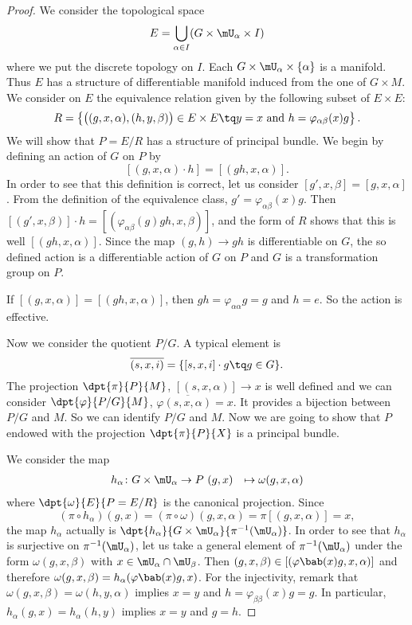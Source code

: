 \begin{proof}
	We consider the topological space
	\begin{equation}
		E=\bigcup_{\alpha\in I}(G\times\mU_{\alpha}\times I)
	\end{equation}
	where we put the discrete topology on $I$. Each $G\times\mU_{\alpha}\times\{\alpha\}$ is a manifold. Thus $E$ has a structure of differentiable manifold induced from the one of $G\times M$. We consider on $E$ the equivalence relation given by the following subset of $E\times E$:
	\[
		R=\left\{\big(  (g,x,\alpha),(h,y,\beta)\big)\in E\times E\tq y=x\text{ and }  h=\varphi_{\alpha\beta}(x)g \right\}.
	\]
	We will show that $P=E/R$ has a structure of principal bundle. We begin by defining an action of $G$ on $P$ by
	\[
		[ (g,x,\alpha)\cdot h ]=[ (gh,x,\alpha) ].
	\]
	In order to see that this definition is correct, let us consider $[g',x,\beta]=[g,x,\alpha]$. From the definition of the equivalence class, $g'=\varphi_{\alpha\beta}(x)g$. Then $[(g',x,\beta)]\cdot h=[(\varphi_{\alpha\beta}(g)gh,x,\beta)]$, and the form of $R$ shows that this is well $[(gh,x,\alpha)]$. Since the map $(g,h)\to gh$ is differentiable on $G$, the so defined action is a differentiable action of $G$ on $P$ and $G$ is a transformation group on $P$.

	If $[(g,x,\alpha)]=[(gh,x,\alpha)]$, then $gh=\varphi_{\alpha\alpha}g=g$ and $h=e$. So the action is effective.

	Now we consider the quotient $P/G$. A typical element is
	\[
		\overline{ (s,x,i) }=\{ [s,x,i]\cdot g\tq g\in G \}.
	\]
	The projection $\dpt{\pi}{P}{M}$, $[(s,x,\alpha)]\to x$ is well defined and we can consider $\dpt{\varphi}{P/G}{M}$, $\varphi\overline{(s,x,\alpha)}=x$. It provides a bijection between $P/G$ and $M$. So we can identify $P/G$ and $M$. Now we are going to show that $P$ endowed with the projection $\dpt{\pi}{P}{X}$ is a principal bundle.

	We consider the map
	\begin{equation}
		\begin{aligned}
			h_{\alpha} \colon G\times\mU_{\alpha} & \to P\
			(g,x)                                 & \mapsto \omega(g,x,\alpha)
		\end{aligned}
	\end{equation}
	where $\dpt{\omega}{E}{P=E/R}$ is the canonical projection. Since
	\[
		(\pi\circ h_{\alpha})(g,x)=(\pi\circ\omega)(g,x,\alpha)=\pi[(g,x,\alpha)]=x,
	\]
	the map $h_{\alpha}$ actually is $\dpt{h_{\alpha}}{G\times\mU_{\alpha}}{\pi^{-1}(\mU_{\alpha})}$. In order to see that $h_{\alpha}$ is surjective on $\pi^{-1}(\mU_{\alpha})$, let us take a general element of $\pi^{-1}(\mU_{\alpha})$ under the form $\omega(g,x,\beta)$ with $x\in\mU_{\alpha}\cap\mU_{\beta}$. Then $(g,x,\beta)\in[ (\varphi\bab(x)g,x,\alpha) ]$ and therefore $\omega(g,x,\beta)=h_{\alpha}(\varphi\bab(x)g,x)$. For the injectivity, remark that $\omega(g,x,\beta)=\omega(h,y,\alpha)$ implies $x=y$ and $h=\varphi_{\beta\beta}(x)g=g$. In particular, $h_{\alpha}(g,x)=h_{\alpha}(h,y)$ implies $x=y$ and $g=h$.


\end{proof}
